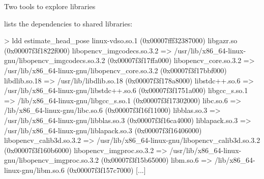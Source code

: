 \documentclass[compress]{beamer}
\begin{document}
\begin{frame}[fragile]{Two tools to explore libraries}


 lists the dependencies to shared libraries:

\begin{shcode}
> ldd estimate_head_pose 
linux-vdso.so.1 (0x00007fff32387000)
libgazr.so (0x00007f3f1822f000)
libopencv_imgcodecs.so.3.2 => /usr/lib/x86_64-linux-gnu/libopencv_imgcodecs.so.3.2 (0x00007f3f17ffa000)
libopencv_core.so.3.2 => /usr/lib/x86_64-linux-gnu/libopencv_core.so.3.2 (0x00007f3f17bbf000)
libdlib.so.18 => /usr/lib/libdlib.so.18 (0x00007f3f178a8000)
libstdc++.so.6 => /usr/lib/x86_64-linux-gnu/libstdc++.so.6 (0x00007f3f1751a000)
libgcc_s.so.1 => /lib/x86_64-linux-gnu/libgcc_s.so.1 (0x00007f3f17302000)
libc.so.6 => /lib/x86_64-linux-gnu/libc.so.6 (0x00007f3f16f11000)
libblas.so.3 => /usr/lib/x86_64-linux-gnu/libblas.so.3 (0x00007f3f16ca4000)
liblapack.so.3 => /usr/lib/x86_64-linux-gnu/liblapack.so.3 (0x00007f3f16406000)
libopencv_calib3d.so.3.2 => /usr/lib/x86_64-linux-gnu/libopencv_calib3d.so.3.2 (0x00007f3f160b6000)
libopencv_imgproc.so.3.2 => /usr/lib/x86_64-linux-gnu/libopencv_imgproc.so.3.2 (0x00007f3f15b65000)
libm.so.6 => /lib/x86_64-linux-gnu/libm.so.6 (0x00007f3f157c7000)
[...]
\end{shcode}
\end{frame}
\end{document}

